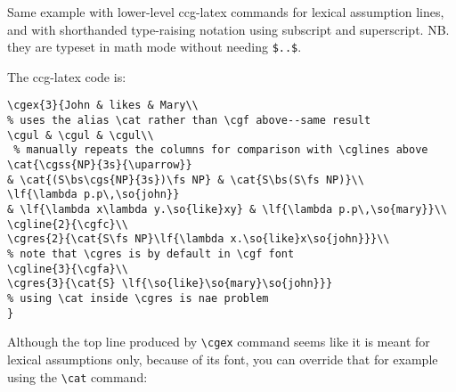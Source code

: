\documentclass[11pt]{article}
\begin{document}
\newpage
Same example with lower-level ccg-latex commands for lexical assumption lines, and with shorthanded 
type-raising notation using subscript and superscript. NB. they are typeset in math mode without needing \verb|$..$|.\bigskip

\bigskip

The ccg-latex code is:

\begin{verbatim}
\cgex{3}{John & likes & Mary\\ 
% uses the alias \cat rather than \cgf above--same result
\cgul & \cgul & \cgul\\ 
 % manually repeats the columns for comparison with \cglines above 
\cat{\cgss{NP}{3s}{\uparrow}} 
& \cat{(S\bs\cgs{NP}{3s})\fs NP} & \cat{S\bs(S\fs NP)}\\
\lf{\lambda p.p\,\so{john}} 
& \lf{\lambda x\lambda y.\so{like}xy} & \lf{\lambda p.p\,\so{mary}}\\
\cgline{2}{\cgfc}\\
\cgres{2}{\cat{S\fs NP}\lf{\lambda x.\so{like}x\so{john}}}\\  
% note that \cgres is by default in \cgf font
\cgline{3}{\cgfa}\\
\cgres{3}{\cat{S} \lf{\so{like}\so{mary}\so{john}}} 
% using \cat inside \cgres is nae problem
}
\end{verbatim}

Although the top line produced by \verb|\cgex| command seems like it is meant for lexical assumptions only, because of its font, you can override that for example using the \verb|\cat| command:

\medskip
\end{document}

